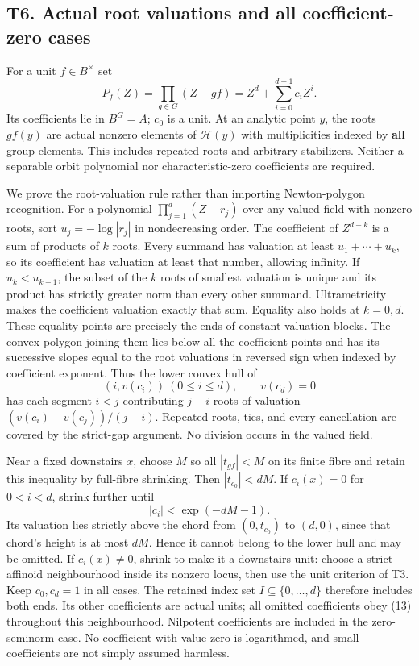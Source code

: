 \documentclass[
  10pt,
]{article}
\begin{document}
\subsection{T6. Actual root valuations and all coefficient-zero
cases}\label{t6.-actual-root-valuations-and-all-coefficient-zero-cases}

For a unit \(f\in B^\times\) set \[
 P_f(Z)=\prod_{g\in G}(Z-gf)
             =Z^d+\sum_{i=0}^{d-1}c_iZ^i.               \tag{11}
\] Its coefficients lie in \(B^G=A\); \(c_0\) is a unit. At an analytic
point \(y\), the roots \(gf(y)\) are actual nonzero elements of
\(\mathcal H(y)\) with multiplicities indexed by \textbf{all} group
elements. This includes repeated roots and arbitrary stabilizers.
Neither a separable orbit polynomial nor characteristic-zero
coefficients are required.

We prove the root-valuation rule rather than importing Newton-polygon
recognition. For a polynomial \(\prod_{j=1}^d(Z-r_j)\) over any valued
field with nonzero roots, sort \(u_j=-\log|r_j|\) in nondecreasing
order. The coefficient of \(Z^{d-k}\) is a sum of products of \(k\)
roots. Every summand has valuation at least \(u_1+\cdots+u_k\), so its
coefficient has valuation at least that number, allowing infinity. If
\(u_k<u_{k+1}\), the subset of the \(k\) roots of smallest valuation is
unique and its product has strictly greater norm than every other
summand. Ultrametricity makes the coefficient valuation exactly that
sum. Equality also holds at \(k=0,d\). These equality points are
precisely the ends of constant-valuation blocks. The convex polygon
joining them lies below all the coefficient points and has its
successive slopes equal to the root valuations in reversed sign when
indexed by coefficient exponent. Thus the lower convex hull of \[
          (i,v(c_i))\ (0\le i\le d),\qquad v(c_d)=0      \tag{12}
\] has each segment \(i<j\) contributing \(j-i\) roots of valuation
\((v(c_i)-v(c_j))/(j-i)\). Repeated roots, ties, and every cancellation
are covered by the strict-gap argument. No division occurs in the valued
field.

Near a fixed downstairs \(x\), choose \(M\) so all \(|t_{gf}|<M\) on its
finite fibre and retain this inequality by full-fibre shrinking. Then
\(|t_{c_0}|<dM\). If \(c_i(x)=0\) for \(0<i<d\), shrink further until \[
                      |c_i|<\exp(-dM-1).                \tag{13}
\] Its valuation lies strictly above the chord from \((0,t_{c_0})\) to
\((d,0)\), since that chord's height is at most \(dM\). Hence it cannot
belong to the lower hull and may be omitted. If \(c_i(x)\ne0\), shrink
to make it a downstairs unit: choose a strict affinoid neighbourhood
inside its nonzero locus, then use the unit criterion of T3. Keep
\(c_0,c_d=1\) in all cases. The retained index set
\(I\subseteq\{0,\ldots,d\}\) therefore includes both ends. Its other
coefficients are actual units; all omitted coefficients obey (13)
throughout this neighbourhood. Nilpotent coefficients are included in
the zero-seminorm case. No coefficient with value zero is logarithmed,
and small coefficients are not simply assumed harmless.
\end{document}
